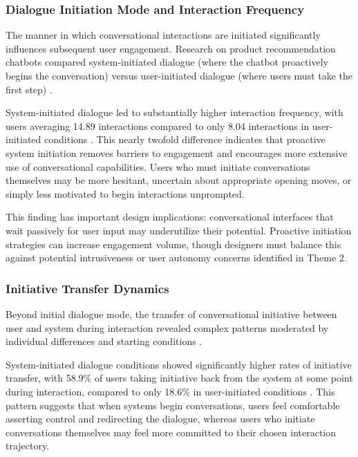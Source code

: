 \documentclass[manuscript,anonymous,sigconf]{acmart}
\begin{document}
\subsubsection{Dialogue Initiation Mode and Interaction Frequency}

The manner in which conversational interactions are initiated significantly influences subsequent user engagement. Research on product recommendation chatbots compared system-initiated dialogue (where the chatbot proactively begins the conversation) versus user-initiated dialogue (where users must take the first step) \cite{A42}.

System-initiated dialogue led to substantially higher interaction frequency, with users averaging 14.89 interactions compared to only 8.04 interactions in user-initiated conditions \cite{A42}. This nearly twofold difference indicates that proactive system initiation removes barriers to engagement and encourages more extensive use of conversational capabilities. Users who must initiate conversations themselves may be more hesitant, uncertain about appropriate opening moves, or simply less motivated to begin interactions unprompted.

This finding has important design implications: conversational interfaces that wait passively for user input may underutilize their potential. Proactive initiation strategies can increase engagement volume, though designers must balance this against potential intrusiveness or user autonomy concerns identified in Theme 2.

\subsubsection{Initiative Transfer Dynamics}

Beyond initial dialogue mode, the transfer of conversational initiative between user and system during interaction revealed complex patterns moderated by individual differences and starting conditions \cite{A42}.

System-initiated dialogue conditions showed significantly higher rates of initiative transfer, with 58.9\% of users taking initiative back from the system at some point during interaction, compared to only 18.6\% in user-initiated conditions \cite{A42}. This pattern suggests that when systems begin conversations, users feel comfortable asserting control and redirecting the dialogue, whereas users who initiate conversations themselves may feel more committed to their chosen interaction trajectory.
\end{document}
